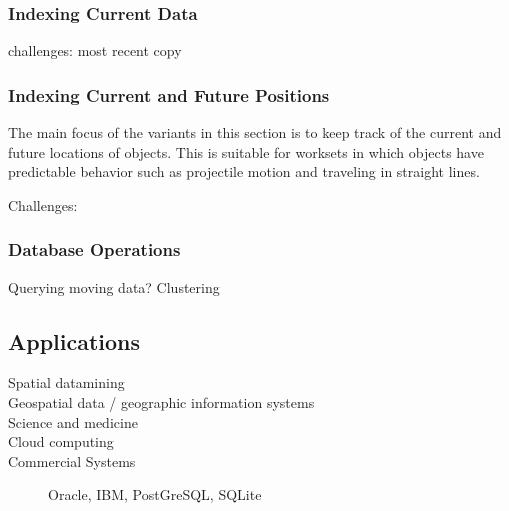 \subsubsection{Indexing Current Data}
challenges: most recent copy

\subsubsection{Indexing Current and Future Positions}
The main focus of the variants in this section is to keep track of the current
and future locations of objects. This is suitable for worksets in which 
objects have predictable behavior such as projectile motion and traveling in
straight lines.

Challenges:

\subsubsection{Database Operations}
Querying moving data?
Clustering

\subsection{Applications}
\begin{description}
	\item[Spatial datamining]
	\item[Geospatial data / geographic information systems]
	\item[Science and medicine]
	\item[Cloud computing]
	\item[Commercial Systems] Oracle, IBM, PostGreSQL, SQLite
\end{description}

